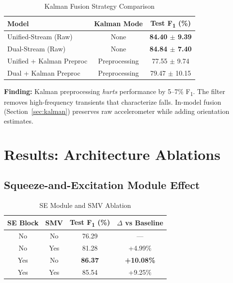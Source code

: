 \documentclass[journal,12pt]{IEEEtran}
\newcommand{\best}[1]{\textbf{\textcolor{bestresult}{#1}}}
\newcommand{\fone}{F\textsubscript{1}}
\begin{document}
\begin{table}[htbp]
\centering
\caption{Kalman Fusion Strategy Comparison}
\label{tab:kalman_preprocess}
\begin{tabular}{@{}lcc@{}}
\toprule
\textbf{Model} & \textbf{Kalman Mode} & \textbf{Test \fone{} (\%)} \\
\midrule
Unified-Stream (Raw) & None & \best{84.40 $\pm$ 9.39} \\
Dual-Stream (Raw) & None & \best{84.84 $\pm$ 7.40} \\
Unified + Kalman Preproc & Preprocessing & 77.55 $\pm$ 9.74 \\
Dual + Kalman Preproc & Preprocessing & 79.47 $\pm$ 10.15 \\
\bottomrule
\end{tabular}
\end{table}

\textbf{Finding:} Kalman preprocessing \emph{hurts} performance by 5--7\% \fone{}. The filter removes high-frequency transients that characterize falls. In-model fusion (Section~\ref{sec:kalman}) preserves raw accelerometer while adding orientation estimates.


\section{Results: Architecture Ablations}
\label{sec:arch_ablation}

\subsection{Squeeze-and-Excitation Module Effect}

\begin{table}[htbp]
\centering
\caption{SE Module and SMV Ablation}
\label{tab:se}
\begin{tabular}{@{}cccc@{}}
\toprule
\textbf{SE Block} & \textbf{SMV} & \textbf{Test \fone{} (\%)} & $\Delta$ \textbf{vs Baseline} \\
\midrule
No & No & 76.29 & --- \\
No & Yes & 81.28 & +4.99\% \\
Yes & No & \best{86.37} & \best{+10.08\%} \\
Yes & Yes & 85.54 & +9.25\% \\
\bottomrule
\end{tabular}
\end{table}
\end{document}
